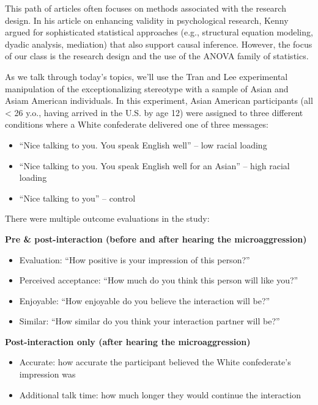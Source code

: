 \documentclass[
  english,
]{book}
\providecommand{\tightlist}{%
  \setlength{\itemsep}{0pt}\setlength{\parskip}{0pt}}
\begin{document}
This path of articles often focuses on methods associated with the research design. In his \citeyearpar{kenny_enhancing_2019} article on enhancing validity in psychological research, Kenny argued for sophisticated statistical approaches (e.g., structural equation modeling, dyadic analysis, mediation) that also support causal inference. However, the focus of our class is the research design and the use of the ANOVA family of statistics.

As we talk through today's topics, we'll use the Tran and Lee \citeyearpar{tran_you_2014} experimental manipulation of the exceptionalizing stereotype with a sample of Asian and Asiam American individuals. In this experiment, Asian American participants (all \textless{} 26 y.o., having arrived in the U.S. by age 12) were assigned to three different conditions where a White confederate delivered one of three messages:

\begin{itemize}
\tightlist
\item
  ``Nice talking to you. You speak English well'' -- low racial loading
\item
  ``Nice talking to you. You speak English well for an Asian'' -- high racial loading
\item
  ``Nice talking to you'' -- control
\end{itemize}

There were multiple outcome evaluations in the study:

\textbf{Pre \& post-interaction (before and after hearing the microaggression)}

\begin{itemize}
\tightlist
\item
  Evaluation: ``How positive is your impression of this person?''
\item
  Perceived acceptance: ``How much do you think this person will like you?''
\item
  Enjoyable: ``How enjoyable do you believe the interaction will be?''
\item
  Similar: ``How similar do you think your interaction partner will be?''
\end{itemize}

\textbf{Post-interaction only (after hearing the microaggression)}

\begin{itemize}
\tightlist
\item
  Accurate: how accurate the participant believed the White confederate's impression was
\item
  Additional talk time: how much longer they would continue the interaction
\end{itemize}
\end{document}
